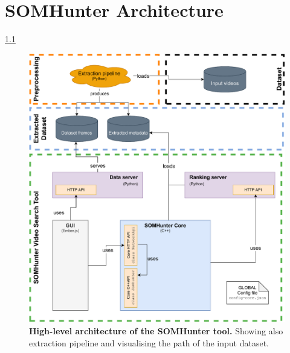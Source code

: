 \chapter{SOMHunter Architecture}
\label{arch}

\cref{fig:sh-arch}



\begin{figure}[b]
	\centering
	\includegraphics[width=1.0\textwidth]{img/diagrams/sh-arch.pdf}
	\caption{\textbf{High-level architecture of the SOMHunter tool.} Showing also extraction pipeline and visualising the path of the input dataset.}
	\label{fig:sh-arch}
\end{figure}
